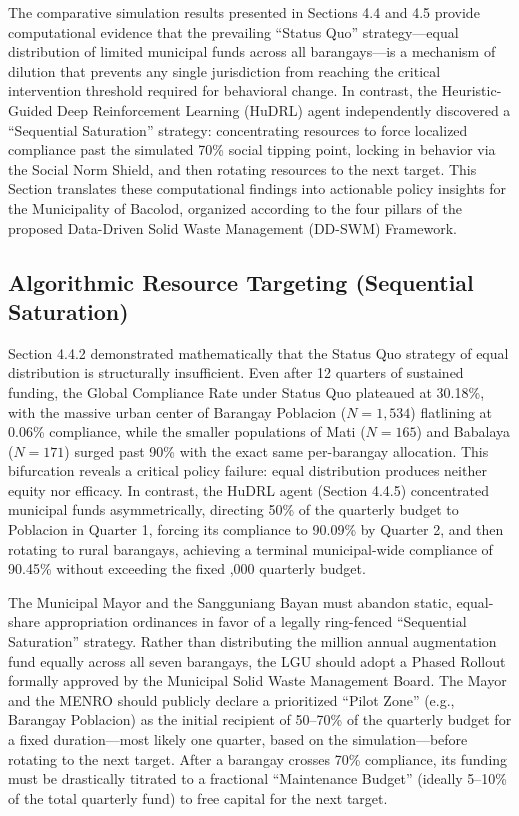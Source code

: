 The comparative simulation results presented in Sections 4.4 and 4.5 provide computational evidence that the prevailing ``Status Quo'' strategy---equal distribution of limited municipal funds across all barangays---is a mechanism of dilution that prevents any single jurisdiction from reaching the critical intervention threshold required for behavioral change. In contrast, the Heuristic-Guided Deep Reinforcement Learning (HuDRL) agent independently discovered a ``Sequential Saturation'' strategy: concentrating resources to force localized compliance past the simulated 70\% social tipping point, locking in behavior via the Social Norm Shield, and then rotating resources to the next target. This Section translates these computational findings into actionable policy insights for the Municipality of Bacolod, organized according to the four pillars of the proposed Data-Driven Solid Waste Management (DD-SWM) Framework.

\subsection{Algorithmic Resource Targeting (Sequential Saturation)}

Section 4.4.2 demonstrated mathematically that the Status Quo strategy of equal distribution is structurally insufficient. Even after 12 quarters of sustained funding, the Global Compliance Rate under Status Quo plateaued at 30.18\%, with the massive urban center of Barangay Poblacion ($N=1,534$) flatlining at 0.06\% compliance, while the smaller populations of Mati ($N=165$) and Babalaya ($N=171$) surged past 90\% with the exact same per-barangay allocation. This bifurcation reveals a critical policy failure: equal distribution produces neither equity nor efficacy. In contrast, the HuDRL agent (Section 4.4.5) concentrated municipal funds asymmetrically, directing 50\% of the quarterly budget to Poblacion in Quarter 1, forcing its compliance to 90.09\% by Quarter 2, and then rotating to rural barangays, achieving a terminal municipal-wide compliance of 90.45\% without exceeding the fixed ,000 quarterly budget.

The Municipal Mayor and the Sangguniang Bayan must abandon static, equal-share appropriation ordinances in favor of a legally ring-fenced “Sequential Saturation” strategy. Rather than distributing the  million annual augmentation fund equally across all seven barangays, the LGU should adopt a Phased Rollout formally approved by the Municipal Solid Waste Management Board. The Mayor and the MENRO should publicly declare a prioritized “Pilot Zone” (e.g., Barangay Poblacion) as the initial recipient of 50--70\% of the quarterly budget for a fixed duration---most likely one quarter, based on the simulation---before rotating to the next target. After a barangay crosses 70\% compliance, its funding must be drastically titrated to a fractional “Maintenance Budget” (ideally 5--10\% of the total quarterly fund) to free capital for the next target.

